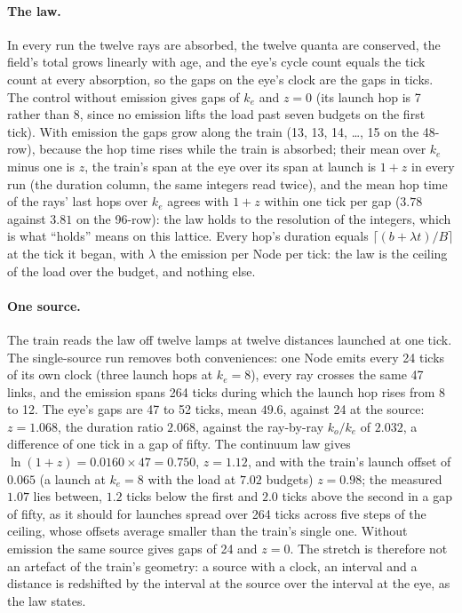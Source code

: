 \documentclass[11pt]{article}
\begin{document}
\paragraph{The law.} In every run the twelve rays are absorbed, the twelve quanta are conserved, the
field's total grows linearly with age, and the eye's cycle count equals the tick
count at every absorption, so the gaps on the eye's clock are the gaps in
ticks. The control without emission gives gaps of $k_e$ and $z = 0$ (its launch hop is 7 rather than 8, since no emission lifts the load past seven budgets on the first tick).
With emission the gaps grow along the train (13, 13, 14, \dots, 15 on the
48-row), because the hop time rises while the train is absorbed; their mean
over $k_e$ minus one is $z$, the train's span at the eye over its span at
launch is $1 + z$ in every run (the duration column, the same integers
read twice), and the mean hop time of the rays' last hops over $k_e$ agrees
with $1 + z$ within one tick per gap ($3.78$ against $3.81$ on the 96-row):
the law holds to the resolution of the integers, which is what ``holds''
means on this lattice. Every hop's duration
equals $\lceil (b + \lambda t)/B \rceil$ at the tick it began, with $\lambda$
the emission per Node per tick: the law is the ceiling of the load over the
budget, and nothing else.

\paragraph{One source.} The train reads the law off twelve lamps at
twelve distances launched at one tick. The single-source run removes both
conveniences: one Node emits every 24 ticks of its own clock (three launch
hops at $k_e = 8$), every ray crosses the same 47 links, and the emission
spans 264 ticks during which the launch hop rises from 8 to 12. The eye's
gaps are 47 to 52 ticks, mean $49.6$, against 24 at the source: $z =
1.068$, the duration ratio $2.068$, against the ray-by-ray $k_o/k_e$ of
$2.032$, a difference of one tick in a gap of fifty. The continuum law
gives $\ln(1+z) = 0.0160 \times 47 = 0.750$, $z = 1.12$, and with the
train's launch offset of $0.065$ (a launch at $k_e = 8$ with the load at
$7.02$ budgets) $z = 0.98$; the measured $1.07$ lies between, $1.2$ ticks
below the first and $2.0$ ticks above the second in a gap of fifty, as it
should for launches spread over 264 ticks across five steps of the
ceiling, whose offsets average smaller than the train's single one. Without emission the same source gives gaps of 24 and $z = 0$. The stretch is therefore not an artefact of the train's
geometry: a source with a clock, an interval and a distance is redshifted
by the interval at the source over the interval at the eye, as the law
states.
\end{document}

